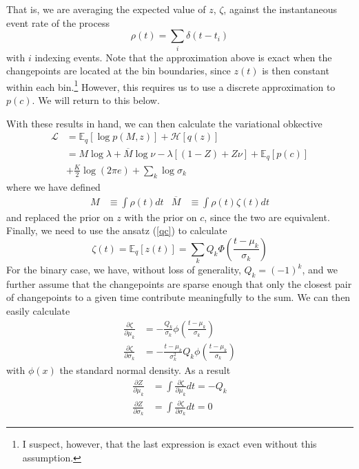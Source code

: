 \documentclass[11pt]{article}
\begin{document}
That is, we are averaging the expected value of $z$, $\zeta$, against the instantaneous event rate of the process
\begin{equation}
    \rho(t) = \sum_i \delta(t - t_i)
\end{equation}
with $i$ indexing events. Note that the approximation above is exact when the changepoints are located at the bin boundaries, since $z(t)$ is then constant within each bin.\footnote{I suspect, however, that the last expression is exact even without this assumption.} However, this requires us to use a discrete approximation to $p(c)$. We will return to this below.

With these results in hand, we can then calculate the variational obkective
\begin{align}
    \mathcal{L} &= \mathbb{E}_q [\log p(M, z)] + \mathcal{H}[q(z)] \\
    &= M \log \lambda + \overline{M} \log \nu - \lambda [(1 - Z) + Z\nu] + \mathbb{E}_q[p(c)] \\
    &+ \frac{K}{2}\log(2\pi e) + \sum_k \log \sigma_k
\end{align}
where we have defined
\begin{align}
    M &\equiv \int \rho(t) dt & 
    \overline{M} &\equiv \int \rho(t) \zeta(t) dt
\end{align}
and replaced the prior on $z$ with the prior on $c$, since the two are equivalent. Finally, we need to use the ansatz (\ref{qc}) to calculate
\begin{equation}
    \zeta(t) = \mathbb{E}_q[z(t)] = \sum_k Q_k \Phi\left(\frac{t - \mu_k}{\sigma_k} \right)
\end{equation}
For the binary case, we have, without loss of generality, $Q_k = (-1)^k$, and we further assume that the changepoints are sparse enough that only the closest pair of changepoints to a given time contribute meaningfully to the sum. We can then easily calculate
\begin{align}
    \frac{\partial \zeta}{\partial \mu_k} &= -\frac{Q_k}{\sigma_k}\phi\left( \frac{t - \mu_k}{\sigma_k}\right) \\
    \frac{\partial \zeta}{\partial \sigma_k} &= -\frac{t - \mu_k}{\sigma_k^2} Q_k\phi\left( \frac{t - \mu_k}{\sigma_k}\right)
\end{align}
with $\phi(x)$ the standard normal density. As a result
\begin{align}
    \frac{\partial Z}{\partial \mu_k} &= \int \frac{\partial \zeta}{\partial \mu_k} dt = -Q_k \\
    \frac{\partial Z}{\partial \sigma_k} &= \int \frac{\partial \zeta}{\partial \sigma_k} dt = 0
\end{align}
\end{document}
